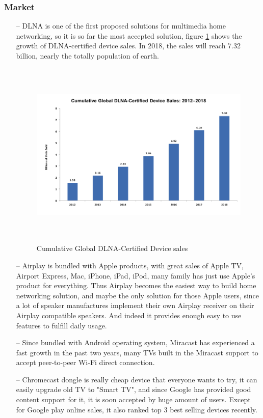 \subsubsection{Market}
\begin{itemize}
\item[--]DLNA is one of the first proposed solutions for multimedia home networking, so it is so 
far the most accepted solution, figure \ref{dlna_market} shows the growth of
DLNA-certified device sales. In 2018, the sales will reach 7.32 billion, nearly
the totally population of earth.

\begin{figure}[htb]
\centering \includegraphics[height=9cm]{charts/dlna_market}
\caption{Cumulative Global DLNA-Certified Device sales \label{dlna_market}}
\end{figure}

\item[--]Airplay is bundled with Apple products, with great sales of Apple TV, Airport Express, 
Mac, iPhone, iPad, iPod, many family has just use Apple's product for everything. Thus Airplay 
becomes the easiest way to build home networking solution, and maybe the only solution for those 
Apple users, since a lot of speaker manufactures implement their own Airplay receiver on their 
Airplay compatible speakers. And indeed it provides enough easy to use features to fulfill daily usage.
\item[--]Since bundled with Android operating system, Miracast has experienced a fast growth in 
the past two years, many TVs built in the Miracast support to accept peer-to-peer Wi-Fi direct connection.
\item[--]Chromecast dongle is really cheap device that everyone wants to try, it can easily upgrade 
old TV to "Smart TV", and since Google has provided good content support for it, it is soon accepted 
by huge amount of users. Except for Google play online sales, it also ranked top 3 best selling devices 
recently.
\end{itemize}

